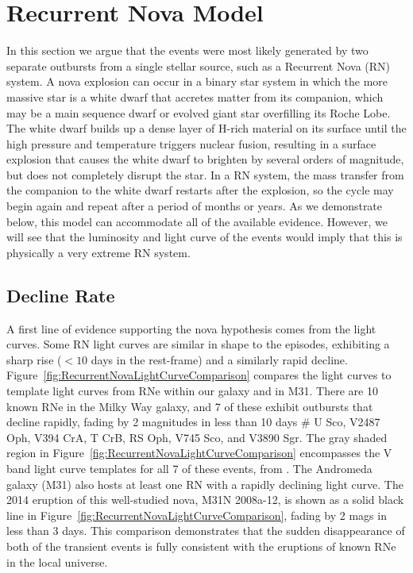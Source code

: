 \section{Recurrent Nova Model}
\label{sec:RecurrentNovaModel}

In this section we argue that the \spock events were most likely
generated by two separate outbursts from a single stellar source, such
as a Recurrent Nova (RN) system. A nova explosion can occur in a
binary star system in which the more massive star is a white dwarf
that accretes matter from its companion, which may be a main sequence
dwarf or evolved giant star overfilling its Roche Lobe. The white
dwarf builds up a dense layer of H-rich material on its surface until
the high pressure and temperature triggers nuclear fusion, resulting
in a surface explosion that causes the white dwarf to brighten by
several orders of magnitude, but does not completely disrupt the
star. In a RN system, the mass transfer from the companion to the
white dwarf restarts after the explosion, so the cycle may begin again
and repeat after a period of months or years.  As we demonstrate
below, this model can accommodate all of the available evidence.
However, we will see that the luminosity and light curve of the \spock
events would imply that this is physically a very extreme RN system.

\subsection{Decline Rate}

A first line of evidence supporting the nova hypothesis comes from the
\spock light curves. Some RN light curves are similar in shape to the
\spock episodes, exhibiting a sharp rise ($<10$ days in the
rest-frame) and a similarly rapid decline.
Figure~\ref{fig:RecurrentNovaLightCurveComparison} compares the \spock
light curves to template light curves from RNe within our galaxy and
in M31.  There are 10 known RNe in the Milky Way galaxy, and 7 of
these exhibit outbursts that decline rapidly, fading by 2 magnitudes
in less than 10 days \citep{Schaefer:2010}
# U Sco, V2487 Oph, V394 CrA, T CrB, RS Oph, V745  Sco, and V3890 Sgr.
The gray shaded region in
Figure~\ref{fig:RecurrentNovaLightCurveComparison} encompasses the V
band light curve templates for all 7 of these events, from
\citet{Schaefer:2010}.  The Andromeda galaxy (M31) also hosts at least
one RN with a rapidly declining light curve.  The 2014 eruption of
this well-studied nova, M31N 2008a-12, is shown as a solid black line
in Figure~\ref{fig:RecurrentNovaLightCurveComparison}, fading by 2
mags in less than 3 days.  This comparison demonstrates that the
sudden disappearance of both of the \spock transient events is fully
consistent with the eruptions of known RNe in the local universe.

